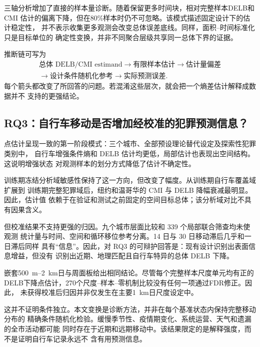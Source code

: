 三轴分析增加了直接的样本量诊断。随着保留更多时间块，相对完整样本DELB和CMI
估计的偏离下降，但在80\%样本时仍不可忽略。该模式描述固定设计下的估计稳定性，
并不表示收集更多观测会改变总体误差底线。同样，面积--时间标准化只是目标单位的
确定性变换，并非不同聚合层级共享同一总体下界的证据。

推断链可写为
\begin{equation}
\begin{gathered}
\text{总体 DELB/CMI estimand}
\longrightarrow
\text{有限样本估计}
\longrightarrow
\text{估计量偏差}\\
\longrightarrow
\text{设计条件随机化参考}
\longrightarrow
\text{实际预测误差}.
\end{gathered}
\label{eq:discussion_inference_chain}
\end{equation}
每个箭头都改变了所回答的问题。若混淆这些层次，就会把一个熵差估计解释成数据并不
支持的更强结论。

\subsection{RQ3：自行车移动是否增加经校准的犯罪预测信息？}
\label{subsec:discussion_rq3}

点估计呈现一致的第一阶段模式：三个城市、全部预设理论替代设定及探索性犯罪类别中，
自行车增强条件熵和 DELB 估计均更低，局部估计也表现出空间结构。这说明增强状态
对观测样本的划分方式降低了估计不确定性。

训练期冻结分析域敏感性保持了这一方向，但改变了幅度。从训练期自行车覆盖域扩展到
训练期完整犯罪域后，纽约和温哥华的 CMI 与 DELB 降幅衰减最明显。因此，估计值
依赖于在验证和测试之前固定的空间目标总体；该分析域对比不具有因果含义。

但校准结果不支持更强的归因。九个城市层面比较和 339 个局部联合筛查均未使观测
统计量与时间、空间和循环移位参考分离。14 日与 30 日移动滞后几乎和一日滞后同样
具有“信息”。因此，对 RQ3 的可辩护回答是：现有设计识别出表面信息增益，但没有
识别出近期、地理匹配且自行车特异的总体 DELB 下降。

嵌套500~m--2~km日与周面板给出相同结论。尽管每个完整样本尺度单元均有正的
DELB下降点估计，270个尺度--样本--零机制比较没有任何一项通过FDR修正。因此，
未获得校准后归因并非仅发生在主要1~km日尺度设定中。

这并不证明条件独立。本文变换是诊断方法，并非在每个基准状态内保持完整移动分布的
精确条件随机化检验。缓慢季节性、疫情期变化、系统运营、天气和遗漏的全市活动都可能
同时存在于近期和远期移动中。该结果限定的是解释强度，而不是证明自行车记录永远不
含有用预测信息。

